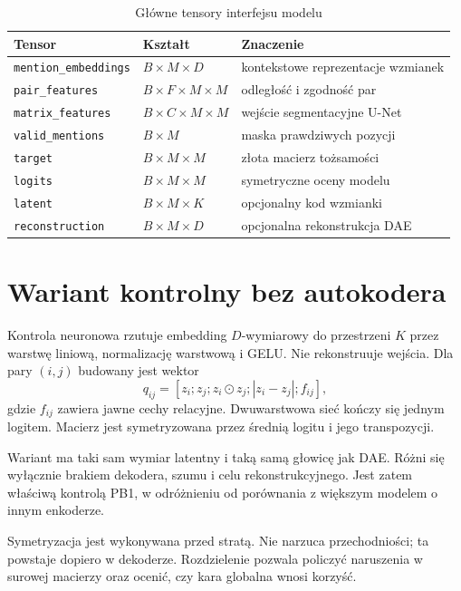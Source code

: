 \begin{table}[htbp]
  \centering
  \caption{Główne tensory interfejsu modelu}
  \label{tab:tensory-systemu}
  \begin{tabular}{p{}p{}p{}}
    \toprule
    Tensor & Kształt & Znaczenie \\
    \midrule
    \texttt{mention\_embeddings} & $B\times M\times D$ & kontekstowe reprezentacje wzmianek \\
    \texttt{pair\_features} & $B\times F\times M\times M$ & odległość i zgodność par \\
    \texttt{matrix\_features} & $B\times C\times M\times M$ & wejście segmentacyjne U-Net \\
    \texttt{valid\_mentions} & $B\times M$ & maska prawdziwych pozycji \\
    \texttt{target} & $B\times M\times M$ & złota macierz tożsamości \\
    \texttt{logits} & $B\times M\times M$ & symetryczne oceny modelu \\
    \texttt{latent} & $B\times M\times K$ & opcjonalny kod wzmianki \\
    \texttt{reconstruction} & $B\times M\times D$ & opcjonalna rekonstrukcja DAE \\
    \bottomrule
  \end{tabular}
\end{table}

\section{Wariant kontrolny bez autokodera}
\label{sec:system-baseline}

Kontrola neuronowa rzutuje embedding $D$-wymiarowy do przestrzeni $K$ przez warstwę liniową, normalizację warstwową i GELU. Nie rekonstruuje wejścia. Dla pary $(i,j)$ budowany jest wektor
\[
q_{ij}=[z_i;z_j;z_i\odot z_j;|z_i-z_j|;f_{ij}],
\]
gdzie $f_{ij}$ zawiera jawne cechy relacyjne. Dwuwarstwowa sieć kończy się jednym logitem. Macierz jest symetryzowana przez średnią logitu i jego transpozycji.

Wariant ma taki sam wymiar latentny i taką samą głowicę jak DAE. Różni się wyłącznie brakiem dekodera, szumu i celu rekonstrukcyjnego. Jest zatem właściwą kontrolą PB1, w odróżnieniu od porównania z większym modelem o innym enkoderze.

Symetryzacja jest wykonywana przed stratą. Nie narzuca przechodniości; ta powstaje dopiero w dekoderze. Rozdzielenie pozwala policzyć naruszenia w surowej macierzy oraz ocenić, czy kara globalna wnosi korzyść.

